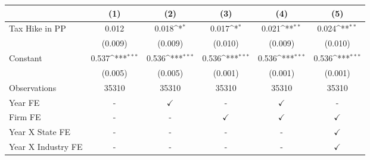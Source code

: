 {
\def\sym#1{\ifmmode^{#1}\else\(^{#1}\)\fi}
\begin{tabular}{l*{5}{c}}
\toprule
                    &\multicolumn{1}{c}{(1)}         &\multicolumn{1}{c}{(2)}         &\multicolumn{1}{c}{(3)}         &\multicolumn{1}{c}{(4)}         &\multicolumn{1}{c}{(5)}         \\
\midrule
Tax Hike in PP      &       0.012         &       0.018\sym{*}  &       0.017\sym{*}  &       0.021\sym{**} &       0.024\sym{**} \\
                    &     (0.009)         &     (0.009)         &     (0.010)         &     (0.009)         &     (0.010)         \\
Constant            &       0.537\sym{***}&       0.536\sym{***}&       0.536\sym{***}&       0.536\sym{***}&       0.536\sym{***}\\
                    &     (0.005)         &     (0.005)         &     (0.001)         &     (0.001)         &     (0.001)         \\
\midrule
Observations        &       35310         &       35310         &       35310         &       35310         &       35310         \\
Year FE             &           -         &$\checkmark$         &           -         &$\checkmark$         &           -         \\
Firm FE             &           -         &           -         &$\checkmark$         &$\checkmark$         &$\checkmark$         \\
Year X State FE     &           -         &           -         &           -         &           -         &$\checkmark$         \\
Year X Industry FE  &           -         &           -         &           -         &           -         &$\checkmark$         \\
\bottomrule
\end{tabular}
}
